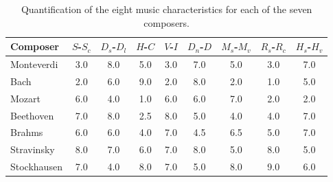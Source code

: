 \documentclass[
 aip,
 jmp,
 amsmath,amssymb,
 reprint,
]{revtex4-1}
\begin{document}
\begin{table}[ht]
\caption{\label{tab:tableA}Quantification of the
eight music characteristics for each of the seven composers.}
\begin{ruledtabular}
\begin{tabular}{|l|c|c|c|c|c|c|c|c|}
\footnotesize
\footnotesize Composer    & \tiny  $S$-$S_c$ & \tiny  $D_s$-$D_l$ & \tiny  $H$-$C$ & \tiny  $V$-$I$ & \tiny  $D_n$-$D$ & \tiny  $M_s$-$M_v$ & \tiny  $R_s$-$R_c$ & \tiny  $H_s$-$H_v$  \\
\hline
 \footnotesize Monteverdi   & 3.0 & 8.0 & 5.0 & 3.0 & 7.0 & 5.0 & 3.0 & 7.0  \\
 \footnotesize Bach         & 2.0 & 6.0 & 9.0 & 2.0 & 8.0 & 2.0 & 1.0 & 5.0  \\
 \footnotesize Mozart       & 6.0 & 4.0 & 1.0 & 6.0 & 6.0 & 7.0 & 2.0 & 2.0  \\
 \footnotesize Beethoven    & 7.0 & 8.0 & 2.5 & 8.0 & 5.0 & 4.0 & 4.0 & 7.0  \\
 \footnotesize Brahms       & 6.0 & 6.0 & 4.0 & 7.0 & 4.5 & 6.5 & 5.0 & 7.0  \\
 \footnotesize Stravinsky   & 8.0 & 7.0 & 6.0 & 7.0 & 8.0 & 5.0 & 8.0 & 5.0  \\
 \footnotesize Stockhausen  & 7.0 & 4.0 & 8.0 & 7.0 & 5.0 & 8.0 & 9.0 & 6.0  \\
\end{tabular}
\end{ruledtabular}
\end{table}
\end{document}
